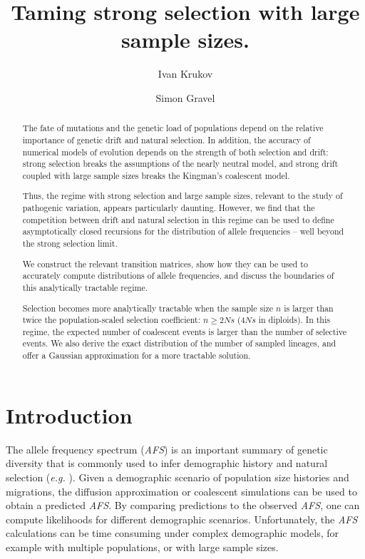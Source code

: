 \documentclass[review]{elsarticle}
\begin{document}
\begin{frontmatter}
  \title{ Taming strong selection with large sample sizes. }

  \author{Ivan Krukov}
  \author{Simon Gravel}

  \begin{abstract}
    The fate of mutations and the genetic load of populations depend on the relative importance of
    genetic drift and natural selection. In addition, the accuracy of numerical models of evolution
    depends on the strength of both selection and drift: strong selection breaks the assumptions of
    the nearly neutral model, and strong drift coupled with large sample sizes breaks the
    Kingman's coalescent model.
  
    Thus, the regime with strong selection and large sample sizes, relevant 
    to the study of pathogenic variation, appears particularly daunting.
    However, we find that the competition between drift and natural selection in this regime can be
    used to define asymptotically closed recursions for the distribution of allele
    frequencies -- well beyond the strong selection limit.
 
    We construct the relevant transition matrices, show how they can be used to accurately compute
    distributions of allele frequencies, and discuss the boundaries of this analytically tractable
    regime.
  
    Selection becomes more analytically tractable when the sample size $n$ is larger than twice the
    population-scaled selection coefficient: $n \ge 2Ns$ ($4Ns$ in diploids). In this regime, the
    expected number of coalescent events is larger than the number of selective events. We also
    derive the exact distribution of the number of sampled lineages, and offer a Gaussian
    approximation for a more tractable solution.
  \end{abstract}

\end{frontmatter}

\section{Introduction}
\label{sec_introduciton}

The allele frequency spectrum (\textit{AFS}) is an important summary of genetic diversity that is
commonly used to infer demographic history and natural selection (\textit{e.g.}
\cite{GutenkunstEtAl2009, KammEtAl2017, JouganousEtAl2017}). Given a demographic scenario of
population size histories and migrations, the diffusion approximation or coalescent simulations can
be used to obtain a predicted \textit{AFS}. By comparing predictions to the observed \textit{AFS},
one can compute likelihoods for different demographic scenarios. Unfortunately, the \textit{AFS}
calculations can be time consuming under complex demographic models, for example with multiple
populations, or with large sample sizes.
\end{document}
